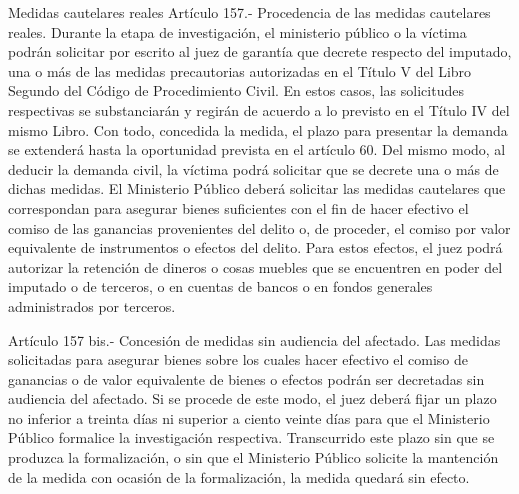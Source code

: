     Medidas cautelares reales
    Artículo 157.- Procedencia de las medidas cautelares reales. Durante la etapa de investigación, el ministerio público o la víctima podrán solicitar por escrito al juez de garantía que decrete respecto del imputado, una o más de las medidas precautorias autorizadas en el Título V del Libro Segundo del Código de Procedimiento Civil. En estos casos, las solicitudes respectivas se substanciarán y regirán de acuerdo a lo previsto en el Título IV del mismo Libro. Con todo, concedida la medida, el plazo para presentar la demanda se extenderá hasta la oportunidad prevista en el artículo 60.
    Del mismo modo, al deducir la demanda civil, la víctima podrá solicitar que se decrete una o más de dichas medidas.
    El Ministerio Público deberá solicitar las medidas cautelares que correspondan para asegurar bienes suficientes con el fin de hacer efectivo el comiso de las ganancias provenientes del delito o, de proceder, el comiso por valor equivalente de instrumentos o efectos del delito. Para estos efectos, el juez podrá autorizar la retención de dineros o cosas muebles que se encuentren en poder del imputado o de terceros, o en cuentas de bancos o en fondos generales administrados por terceros.


    Artículo 157 bis.- Concesión de medidas sin audiencia del afectado. Las medidas solicitadas para asegurar bienes sobre los cuales hacer efectivo el comiso de ganancias o de valor equivalente de bienes o efectos podrán ser decretadas sin audiencia del afectado.
    Si se procede de este modo, el juez deberá fijar un plazo no inferior a treinta días ni superior a ciento veinte días para que el Ministerio Público formalice la investigación respectiva. Transcurrido este plazo sin que se produzca la formalización, o sin que el Ministerio Público solicite la mantención de la medida con ocasión de la formalización, la medida quedará sin efecto.


